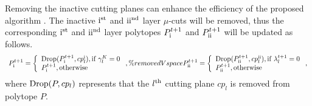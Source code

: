 \documentclass[letterpaper]{article}
\begin{document}
Removing the inactive cutting planes can enhance the efficiency of the proposed algorithm \cite{yang2014distributed,jiao2022distributed}. The inactive ${\rm{\uppercase\expandafter{\romannumeral1}}}^{\rm{st}}$ and ${\rm{\uppercase\expandafter{\romannumeral2}}}^{\rm{nd}}$ layer $\mu$-cuts will be removed, thus the corresponding ${\rm{\uppercase\expandafter{\romannumeral1}}}^{\rm{st}}$ and ${\rm{\uppercase\expandafter{\romannumeral2}}}^{\rm{nd}}$ layer polytopes ${P_{\rm{\uppercase\expandafter{\romannumeral1}}}^{t + 1}}$ and ${P_{\rm{\uppercase\expandafter{\romannumeral2}}}^{t + 1}}$ will be updated as follows.
\begin{equation}
\begin{array}{l}
\label{eq:inactive_inner}
{P_{\rm{\uppercase\expandafter{\romannumeral1}}}^{t + 1}} = \left\{ \begin{array}{l}
{\rm{Drop}}({P_{\rm{\uppercase\expandafter{\romannumeral1}}}^{t + 1}},c{p_l^{\rm{\uppercase\expandafter{\romannumeral1}}}}),{\rm{if}} \;\gamma_l^K=0\\
{P_{\rm{\uppercase\expandafter{\romannumeral1}}}^{t + 1}},{\rm{otherwise}}
\end{array} \right. , \%removedVspace

{P_{{\rm{\uppercase\expandafter{\romannumeral2}}}}^{t + 1}} = \left\{ \begin{array}{l}
{\rm{Drop}}({P_{{\rm{\uppercase\expandafter{\romannumeral2}}}}^{t + 1}},c{p_l^{\rm{\uppercase\expandafter{\romannumeral2}}}}),{\rm{if}} \;\lambda_l^{t+1}=0\\
{P_{{\rm{\uppercase\expandafter{\romannumeral2}}}}^{t + 1}},{\rm{otherwise}}
\end{array} \right. ,
\end{array}
\end{equation}
where ${\rm{Drop}}(P,c{p_l})$ represents that the $l^{\rm{th}}$ cutting plane $c{p_l}$ is removed from polytope $P$.
\end{document}
